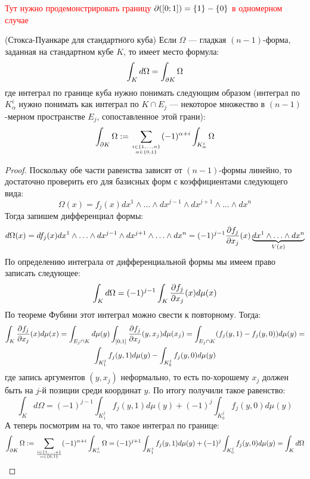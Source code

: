 \textcolor{red}{Тут нужно продемонстрировать границу $\partial([0; 1]) = \{1\} - \{0\}$ в одномерном случае}

\begin{theorem} (Стокса-Пуанкаре для стандартного куба)
	Если $\Omega$ --- гладкая $(n - 1)$-форма, заданная на стандартном кубе $K$, то имеет место формула:
	\[
		\int_K d\Omega = \int_{\partial K} \Omega
	\]
	где интеграл по границе куба нужно понимать следующим образом (интеграл по $K_\alpha^i$ нужно понимать как интеграл по $K \cap E_j$ --- некоторое множество в $(n - 1)$-мерном пространстве $E_j$, сопоставленное этой грани):
	\[
		\int_{\partial K} \Omega := \sum_{i \in \{1, \ldots, n\} \atop {\alpha \in \{0, 1\}}} (-1)^{\alpha + i} \int_{K_\alpha^i} \Omega
	\]
\end{theorem}

\begin{proof}
	Поскольку обе части равенства зависят от $(n - 1)$-формы линейно, то достаточно проверить его для базисных форм с коэффициентами следующего вида:
	\[
		\Omega(x) = f_j(x) dx^1 \wedge \ldots \wedge dx^{j - 1} \wedge dx^{j + 1} \wedge \ldots \wedge dx^n
	\]
	Тогда запишем дифференциал формы:
	\[
		d\Omega(x) = df_j(x)dx^1 \wedge \ldots \wedge dx^{j - 1} \wedge dx^{j + 1} \wedge \ldots \wedge dx^n = (-1)^{j - 1}\frac{\partial f_j}{\partial x_j}(x) \underbrace{dx^1 \wedge \ldots \wedge dx^n}_{V(x)}
	\]
	По определению интеграла от дифференциальной формы мы имеем право записать следующее:
	\[
		\int_K d\Omega = (-1)^{j - 1}\int_K \frac{\partial f_j}{\partial x_j}(x)d\mu(x)
	\]
	По теореме Фубини этот интеграл можно свести к повторному. Тогда:
	\begin{multline*}
		\int_K \frac{\partial f_j}{\partial x_j}(x)d\mu(x) = \int_{E_j \cap K} d\mu(y) \int_{[0; 1]} \frac{\partial f_j}{\partial x_j} (y, x_j) d\mu(x_j) = \int_{E_j \cap K} (f_j(y, 1) - f_j(y, 0))d\mu(y) =
		\\
		\int_{K_1^j} f_j(y, 1)d\mu(y) - \int_{K_0^j} f_j(y, 0)d\mu(y)
	\end{multline*}
	где запись аргументов $(y, x_j)$ неформально, то есть по-хорошему $x_j$ должен быть на $j$-й позиции среди координат $y$. По итогу получили такое равенство:
	\[
		\int_K d\Omega = (-1)^{j - 1}\int_{K_1^j} f_j(y, 1)d\mu(y) + (-1)^j \int_{K_0^j} f_j(y, 0)d\mu(y)
	\]
	А теперь посмотрим на то, что такое интеграл по границе:
	\[
		\int_{\partial K} \Omega := \sum_{i \in \{1, \ldots, n\} \over {\alpha \in \{0, 1\}}} (-1)^{\alpha + i} \int_{K_\alpha^j} \Omega = (-1)^{j + 1} \int_{K_1^j} f_j(y, 1)d\mu(y) + (-1)^j \int_{K_0^j} f_j(y, 0)d\mu(y) = \int_K d\Omega
	\]
\end{proof}

